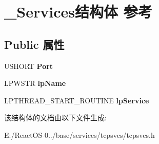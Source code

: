 \hypertarget{struct___services}{}\section{\+\_\+\+Services结构体 参考}
\label{struct___services}
\subsection*{Public 属性}
\begin{DoxyCompactItemize}
\item 
\mbox{\label{struct___services_a5a79cbd25ccb8b0c9ff3e4f4919bc713}} 
U\+S\+H\+O\+RT {\bfseries Port}
\item 
\mbox{\label{struct___services_abd35a93488e3288d50c000abda419a8d}} 
L\+P\+W\+S\+TR {\bfseries lp\+Name}
\item 
\mbox{\label{struct___services_aff1136f511a53500d672542c00184b83}} 
L\+P\+T\+H\+R\+E\+A\+D\+\_\+\+S\+T\+A\+R\+T\+\_\+\+R\+O\+U\+T\+I\+NE {\bfseries lp\+Service}
\end{DoxyCompactItemize}


该结构体的文档由以下文件生成\+:\begin{DoxyCompactItemize}
\item 
E\+:/\+React\+O\+S-\/0../base/services/tcpsvcs/tcpsvcs.\+h\end{DoxyCompactItemize}
